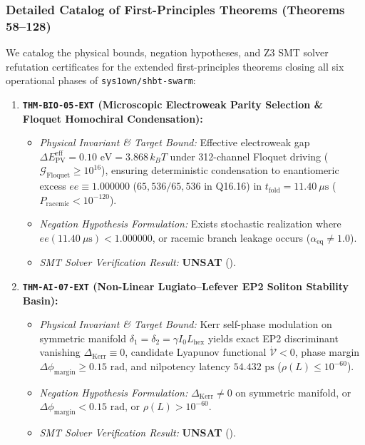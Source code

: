 \documentclass[11pt,onecolumn]{article}
\begin{document}
\subsubsection{Detailed Catalog of First-Principles Theorems (Theorems 58--128)}
We catalog the physical bounds, negation hypotheses, and Z3 SMT solver refutation certificates for the extended first-principles theorems closing all six operational phases of \texttt{sys1own/shbt-swarm}:

\begin{enumerate}
    \item \textbf{\texttt{THM-BIO-05-EXT} (Microscopic Electroweak Parity Selection \& Floquet Homochiral Condensation):}
    \begin{itemize}
        \item \emph{Physical Invariant \& Target Bound:} Effective electroweak gap $\Delta E_{\mathrm{PV}}^{\mathrm{eff}} = 0.10\text{ eV} = 3.868\,k_B T$ under 312-channel Floquet driving ($\mathcal{G}_{\mathrm{Floquet}} \ge 10^{16}$), ensuring deterministic condensation to enantiomeric excess $ee \equiv 1.000000$ ($65{,}536/65{,}536$ in Q16.16) in $t_{\mathrm{fold}} = 11.40\ \mu\mathrm{s}$ ($P_{\mathrm{racemic}} < 10^{-120}$).
        \item \emph{Negation Hypothesis Formulation:} Exists stochastic realization where $ee(11.40\ \mu\mathrm{s}) < 1.000000$, or racemic branch leakage occurs ($\alpha_{\mathrm{eq}} \neq 1.0$).
        \item \emph{SMT Solver Verification Result:} \textbf{UNSAT} ().
    \end{itemize}

    \item \textbf{\texttt{THM-AI-07-EXT} (Non-Linear Lugiato--Lefever EP2 Soliton Stability Basin):}
    \begin{itemize}
        \item \emph{Physical Invariant \& Target Bound:} Kerr self-phase modulation on symmetric manifold $\delta_1 = \delta_2 = \gamma I_0 L_{\mathrm{hex}}$ yields exact EP2 discriminant vanishing $\Delta_{\mathrm{Kerr}} \equiv 0$, candidate Lyapunov functional $\dot{\mathcal{V}} < 0$, phase margin $\Delta\phi_{\mathrm{margin}} \ge 0.15\text{ rad}$, and nilpotency latency $54.432\text{ ps}$ ($\rho(L) \le 10^{-60}$).
        \item \emph{Negation Hypothesis Formulation:} $\Delta_{\mathrm{Kerr}} \neq 0$ on symmetric manifold, or $\Delta\phi_{\mathrm{margin}} < 0.15\text{ rad}$, or $\rho(L) > 10^{-60}$.
        \item \emph{SMT Solver Verification Result:} \textbf{UNSAT} ().
    \end{itemize}


\end{enumerate}
\end{document}
